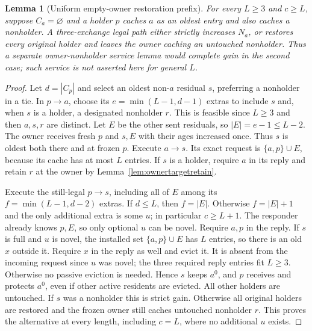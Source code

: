 \documentclass[11pt]{article}
\newtheorem{lemma}[theorem]{Lemma}
\begin{document}
\begin{lemma}[Uniform empty-owner restoration prefix]
\label{lem:generalownerterminalprefix}
For every $L\ge3$ and $c\ge L$, suppose $C_a=\varnothing$
and a holder $p$ caches $a$ as an oldest entry and also caches
a nonholder. A three-exchange legal path either strictly
increases $N_a$, or restores every original holder and leaves
the owner caching an untouched nonholder. Thus a separate
owner-nonholder service lemma would complete gain in the
second case; such service is not asserted here for general $L$.
\end{lemma}
\begin{proof}
Let $d=|C_p|$ and select an oldest non-$a$ residual $s$,
preferring a nonholder in a tie. In $p\to a$, choose its
$e=\min(L-1,d-1)$ extras to include $s$ and, when $s$ is a
holder, a designated nonholder $r$. This is feasible since
$L\ge3$ and then $a,s,r$ are distinct. Let $E$ be the other
sent residuals, so $|E|=e-1\le L-2$.
The owner receives fresh $p$ and $s,E$ with their ages increased
once. Thus $s$ is oldest both there and at frozen $p$.
Execute $a\to s$. Its exact request is $\{a,p\}\cup E$,
because its cache has at most $L$ entries. If $s$ is a holder,
require $a$ in its reply and retain $r$ at the owner by
Lemma~\ref{lem:ownertargetretain}.

Execute the still-legal $p\to s$, including all of $E$ among
its $f=\min(L-1,d-2)$ extras. If $d\le L$, then $f=|E|$.
Otherwise $f=|E|+1$ and the only additional extra is some $u$;
in particular $c\ge L+1$. The responder already knows $p,E$,
so only optional $u$ can be novel. Require $a,p$ in the reply.
If $s$ is full and $u$ is novel, the installed set
$\{a,p\}\cup E$ has $L$ entries, so there is an old $x$
outside it. Require $x$ in the reply as well and evict it.
It is absent from the incoming request since $u$ was novel;
the three required reply entries fit $L\ge3$. Otherwise no
passive eviction is needed. Hence $s$ keeps $a^0$, and $p$
receives and protects $a^0$, even if other active residents
are evicted. All other holders are untouched. If $s$ was a
nonholder this is strict gain. Otherwise all original holders
are restored and the frozen owner still caches untouched
nonholder $r$. This proves the alternative at every length,
including $c=L$, where no additional $u$ exists.
\end{proof}
\end{document}
